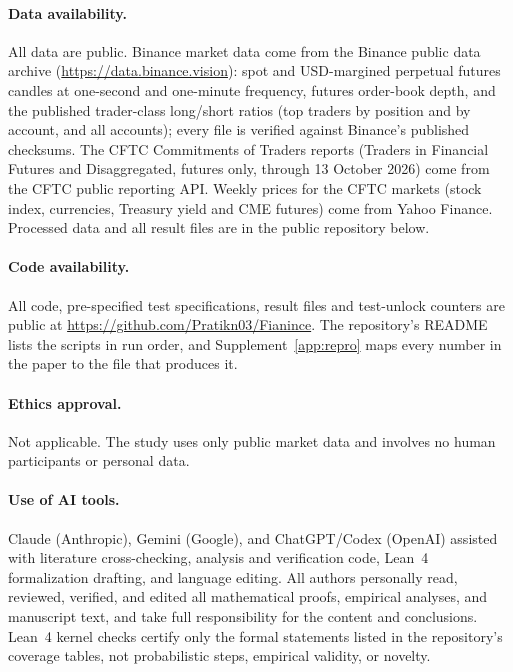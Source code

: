 \documentclass[12pt]{article}
\theoremstyle{definition}
\theoremstyle{remark}
\begin{document}
\paragraph{Data availability.} All data are public. Binance market data come from the Binance public data archive (\url{https://data.binance.vision}): spot and USD-margined perpetual futures candles at one-second and one-minute frequency, futures order-book depth, and the published trader-class long/short ratios (top traders by position and by account, and all accounts); every file is verified against Binance's published checksums. The CFTC Commitments of Traders reports (Traders in Financial Futures and Disaggregated, futures only, through 13 October 2026) come from the CFTC public reporting API. Weekly prices for the CFTC markets (stock index, currencies, Treasury yield and CME futures) come from Yahoo Finance. Processed data and all result files are in the public repository below.

\paragraph{Code availability.} All code, pre-specified test specifications, result files and test-unlock counters are public at \url{https://github.com/Pratikn03/Fianince}. The repository's README lists the scripts in run order, and Supplement~\ref{app:repro} maps every number in the paper to the file that produces it.

\paragraph{Ethics approval.} Not applicable. The study uses only public market data and involves no human participants or personal data.

\paragraph{Use of AI tools.} Claude (Anthropic), Gemini (Google), and ChatGPT/Codex (OpenAI) assisted with literature cross-checking, analysis and verification code, Lean~4 formalization drafting, and language editing. All authors personally read, reviewed, verified, and edited all mathematical proofs, empirical analyses, and manuscript text, and take full responsibility for the content and conclusions. Lean~4 kernel checks certify only the formal statements listed in the repository's coverage tables, not probabilistic steps, empirical validity, or novelty.
\end{document}
